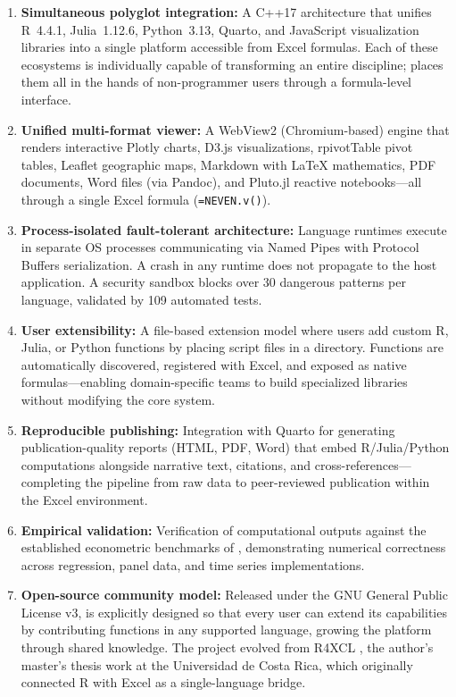 \begin{enumerate}
    \item \textbf{Simultaneous polyglot integration:} A C++17 architecture that unifies R~4.4.1, Julia~1.12.6, Python~3.13, Quarto, and JavaScript visualization libraries into a single platform accessible from Excel formulas. Each of these ecosystems is individually capable of transforming an entire discipline; \neven{} places them all in the hands of non-programmer users through a formula-level interface.

    \item \textbf{Unified multi-format viewer:} A WebView2 (Chromium-based) engine that renders interactive Plotly charts, D3.js visualizations, rpivotTable pivot tables, Leaflet geographic maps, Markdown with LaTeX mathematics, PDF documents, Word files (via Pandoc), and Pluto.jl reactive notebooks---all through a single Excel formula (\texttt{=NEVEN.v()}).

    \item \textbf{Process-isolated fault-tolerant architecture:} Language runtimes execute in separate OS processes communicating via Named Pipes with Protocol Buffers serialization. A crash in any runtime does not propagate to the host application. A security sandbox blocks over 30 dangerous patterns per language, validated by 109 automated tests.

    \item \textbf{User extensibility:} A file-based extension model where users add custom R, Julia, or Python functions by placing script files in a directory. Functions are automatically discovered, registered with Excel, and exposed as native formulas---enabling domain-specific teams to build specialized libraries without modifying the core system.

    \item \textbf{Reproducible publishing:} Integration with Quarto for generating publication-quality reports (HTML, PDF, Word) that embed R/Julia/Python computations alongside narrative text, citations, and cross-references---completing the pipeline from raw data to peer-reviewed publication within the Excel environment.

    \item \textbf{Empirical validation:} Verification of computational outputs against the established econometric benchmarks of \citet{Wooldridge2016}, demonstrating numerical correctness across regression, panel data, and time series implementations.

    \item \textbf{Open-source community model:} Released under the GNU General Public License v3, \neven{} is explicitly designed so that every user can extend its capabilities by contributing functions in any supported language, growing the platform through shared knowledge. The project evolved from R4XCL \citep{BonillaR4XCL2023}, the author's master's thesis work at the Universidad de Costa Rica, which originally connected R with Excel as a single-language bridge.
\end{enumerate}

